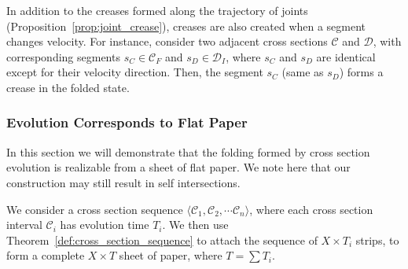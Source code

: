 \begin{proposition}
\label{prop:creases}
In addition to the creases formed along the trajectory of joints (Proposition~\ref{prop:joint_crease}),
creases are also created when a segment changes velocity.
For instance, consider two adjacent cross sections $\mathcal C$ and $\mathcal D$,
with corresponding segments $s_C\in \mathcal C_F$ and $s_D\in \mathcal D_I$,
where $s_C$ and $s_D$ are identical except for their velocity direction.
Then, the segment $s_C$ (same as $s_D$) forms a crease in the folded state.
\end{proposition}

\subsubsection{Evolution Corresponds to Flat Paper}
\label{sec:flat}

In this section we will demonstrate that the folding formed by cross section evolution is realizable from a sheet of flat paper.
We note here that our construction may still result in self intersections.

We consider a cross section sequence $\langle \mathcal C_1, \mathcal C_2,\cdots \mathcal C_n \rangle$,
where each cross section interval $\mathcal C_i$ has evolution time $T_i$.
We then use Theorem~\ref{def:cross_section_sequence} to attach the sequence of $X\times T_i$ strips,
to form a complete $X\times T$ sheet of paper, where $T = \sum T_i$.

